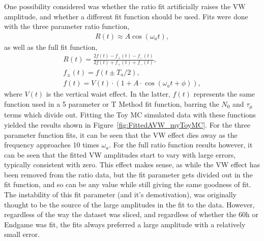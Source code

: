 \documentclass[12pt,letterpaper]{article}
\newcommand{\figref}[1]{Figure~\ref{#1}}
\def\wa{$\omega_{a}$\xspace}
\begin{document}
One possibility considered was whether the ratio fit artificially raises the VW amplitude, and whether a different fit function should be used. Fits were done with the three parameter ratio function,
    \begin{align} \label{eq:threeparamratio}
        R(t) \approx A \cos(\omega_{a}t),
    \end{align}
as well as the full fit function,
    \begin{gather}
        R(t) = \frac{2f(t) - f_{+}(t) - f_{-}(t)}{2f(t) + f_{+}(t) + f_{-}(t)}, \\
        f_{\pm}(t) = f(t \pm T_{a}/2), \\
        f(t) = V(t) \cdot (1 + A \cdot \cos(\omega_{a}t + \phi)),
    \label{eq:fullratiofunction}
    \end{gather}
where $V(t)$ is the vertical waist effect. In the latter, $f(t)$ represents the same function used in a 5 parameter or T Method fit function, barring the $N_{0}$ and $\tau_{\mu}$ terms which divide out. Fitting the Toy MC simulated data with these functions yielded the results shown in \figref{fig:FittedAVW_myToyMC}. For the three parameter function fits, it can be seen that the VW effect dies away as the frequency approaches 10 times \wa. For the full ratio function results however, it can be seen that the fitted VW amplitudes start to vary with large errors, typically consistent with zero. This effect makes sense, as while the VW effect has been removed from the ratio data, but the fit parameter gets divided out in the fit function, and so can be any value while still giving the same goodness of fit. The instability of this fit parameter (and it's demotivation), was originally thought to be the source of the large amplitudes in the fit to the data. However, regardless of the way the dataset was sliced, and regardless of whether the 60h or Endgame was fit, the fits always preferred a large amplitude with a relatively small error.
\end{document}
